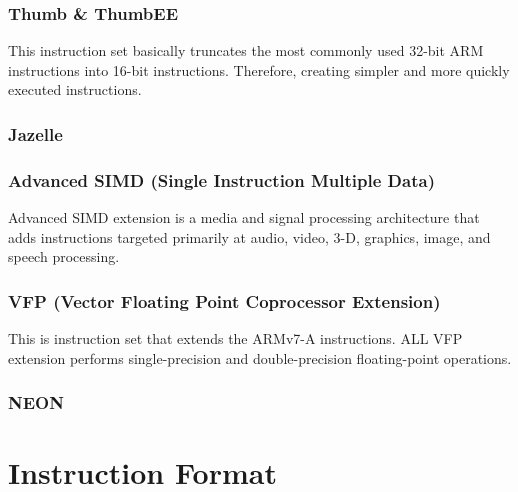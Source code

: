 \documentclass[12pt]{scrreprt}
\begin{document}
		\subsection{Thumb \& ThumbEE}
			This instruction set basically truncates the most commonly used 32-bit ARM instructions into 16-bit instructions.
			Therefore, creating simpler and more quickly executed instructions.

		\subsection{Jazelle}

		\subsection{Advanced SIMD (Single Instruction Multiple Data)}
			Advanced SIMD extension is a media and signal processing architecture that adds instructions targeted primarily at audio, video, 3-D, graphics, image, and speech processing.
		
		\subsection{VFP (Vector Floating Point Coprocessor Extension)}
			This is instruction set that extends the ARMv7-A instructions.
			ALL VFP extension performs single-precision and double-precision floating-point operations.

		\subsection{NEON}

	

{\let\clearpage\relax\chapter{Instruction Format}}
\end{document}
